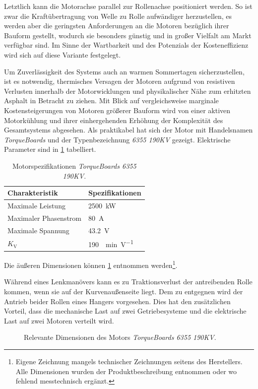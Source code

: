 	Letztlich kann die Motorachse parallel zur Rollenachse positioniert werden.
	So ist zwar die Kraftübertragung von Welle zu Rolle aufwändiger herzustellen, es werden aber die geringsten Anforderungen an die Motoren bezüglich ihrer Bauform gestellt, wodurch sie besonders günstig und in großer Vielfalt am Markt verfügbar sind.
	Im Sinne der Wartbarkeit und des Potenzials der Kosteneffizienz wird sich auf diese Variante festgelegt.\par\medskip
	Um Zuverlässigkeit des Systems auch an warmen Sommertagen sicherzustellen, ist es notwendig, thermisches Versagen der Motoren aufgrund von resistiven Verlusten innerhalb der Motorwicklungen und physikalischer Nähe zum erhitzten Asphalt in Betracht zu ziehen.
	Mit Blick auf vergleichsweise marginale Kostensteigerungen von Motoren größerer Bauform wird von einer aktiven Motorkühlung und ihrer einhergehenden Erhöhung der Komplexität des Gesamtsystems abgesehen.
	Als praktikabel hat sich der Motor mit Handelsnamen \textit{TorqueBoards} und der Typenbezeichnung \textit{6355 190KV} gezeigt.
	Elektrische Parameter sind in \cref{tab:TB 6355 190KV electrical specs} tabelliert.
	\begin{table}[h]
		\centering
		\caption[Motorspezifikationen \textit{TorqueBoards 6355 190KV}]{Motorspezifikationen \textit{TorqueBoards 6355 190KV}.}%
		\label{tab:TB 6355 190KV electrical specs}
		\begin{tabular}{p{}l}
			\toprule
			Charakteristik					& Spezifikationen\\ \midrule
			Maximale Leistung				& \qty{2500}{\kilo\watt}\\
			Maximaler Phasenstrom			& \qty{80}{\ampere}\\
			Maximale Spannung				& \qty{43,2}{\volt}\\
			\(K_\text{V}\)					& \qty{190}{\per\minute\per\volt}\\ \bottomrule
		\end{tabular}
	\end{table}
	Die äußeren Dimensionen können \cref{fig:motor} entnommen werden\footnote{\hspace{1mm} Eigene Zeichnung mangels technischer Zeichnungen seitens des Herstellers.
	Alle Dimensionen wurden der Produktbeschreibung entnommen oder wo fehlend messtechnisch ergänzt.}.
	
	Während eines Lenkmanövers kann es zu Traktionsverlust der antreibenden Rolle kommen, wenn sie auf der Kurvenaußenseite liegt.
	Dem zu entgegnen wird der Antrieb beider Rollen eines Hangers vorgesehen.
	Dies hat den zusätzlichen Vorteil, dass die mechanische Last auf zwei Getriebesysteme und die elektrische Last auf zwei Motoren verteilt wird.
	\begin{figure}[h]
		\centering
		
		\caption{Relevante Dimensionen des Motors \textit{TorqueBoards 6355 190KV}.}%
		\label{fig:motor}
	\end{figure}
